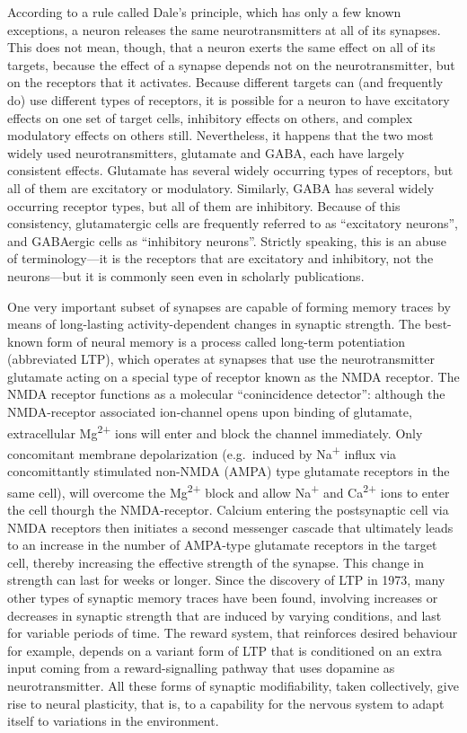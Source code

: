 According to a rule called Dale's principle, which has only a few known exceptions, a neuron releases the same neurotransmitters at all of its synapses. This does not mean, though, that a neuron exerts the same effect on all of its targets, because the effect of a synapse depends not on the neurotransmitter, but on the receptors that it activates. Because different targets can (and frequently do) use different types of receptors, it is possible for a neuron to have excitatory effects on one set of target cells, inhibitory effects on others, and complex modulatory effects on others still. Nevertheless, it happens that the two most widely used neurotransmitters, glutamate and GABA, each have largely consistent effects. Glutamate has several widely occurring types of receptors, but all of them are excitatory or modulatory. Similarly, GABA has several widely occurring receptor types, but all of them are inhibitory. Because of this consistency, glutamatergic cells are frequently referred to as ``excitatory neurons'', and GABAergic cells as ``inhibitory neurons''. Strictly speaking, this is an abuse of terminology---it is the receptors that are excitatory and inhibitory, not the neurons---but it is commonly seen even in scholarly publications.

One very important subset of synapses are capable of forming memory traces by means of long-lasting activity-dependent changes in synaptic strength. The best-known form of neural memory is a process called long-term potentiation (abbreviated LTP), which operates at synapses that use the neurotransmitter glutamate acting on a special type of receptor known as the NMDA receptor. The NMDA receptor functions as a molecular ``conincidence detector'': although the NMDA-receptor associated ion-channel opens upon binding of glutamate, extracellular Mg\textsuperscript{2+} ions will enter and block the channel immediately. Only concomitant membrane depolarization (e.g.~induced by Na\textsuperscript{+} influx via concomittantly stimulated non-NMDA (AMPA) type glutamate receptors in the same cell), will overcome the Mg\textsuperscript{2+} block and allow Na\textsuperscript{+} and Ca\textsuperscript{2+} ions to enter the cell thourgh the NMDA-receptor. Calcium entering the postsynaptic cell via NMDA receptors then initiates a second messenger cascade that ultimately leads to an increase in the number of AMPA-type glutamate receptors in the target cell, thereby increasing the effective strength of the synapse. This change in strength can last for weeks or longer. Since the discovery of LTP in 1973, many other types of synaptic memory traces have been found, involving increases or decreases in synaptic strength that are induced by varying conditions, and last for variable periods of time. The reward system, that reinforces desired behaviour for example, depends on a variant form of LTP that is conditioned on an extra input coming from a reward-signalling pathway that uses dopamine as neurotransmitter. All these forms of synaptic modifiability, taken collectively, give rise to neural plasticity, that is, to a capability for the nervous system to adapt itself to variations in the environment.

